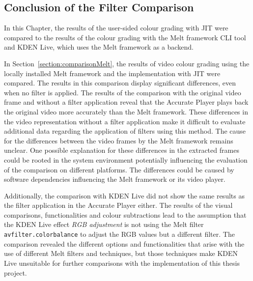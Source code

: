 \documentclass[../MasterThesis.tex]{subfiles}
\begin{document}

\newpage

\subsection{Conclusion of the Filter Comparison} \label{section:resultscomparisons}


In this Chapter, the results of the user-sided colour grading with JIT were compared to the results of the colour grading with the Melt framework CLI tool and KDEN Live, which uses the Melt framework as a backend.

In Section~\ref{section:comparisonMelt}, the results of video colour grading using the locally installed Melt framework and the implementation with JIT were compared. 
The results in this comparison display significant differences, even when no filter is applied. 
The results of the comparison with the original video frame and without a filter application reveal that the Accurate Player plays back the original video more accurately than the Melt framework.
These differences in the video representation without a filter application make it difficult to evaluate additional data regarding the application of filters using this method. The cause for the differences between the video frames by the Melt framework remains unclear.
One possible explanation for these differences in the extracted frames could be rooted in the system environment potentially influencing the evaluation of the comparison on different platforms. The differences could be caused by software dependencies influencing the Melt framework or its video player.



Additionally, the comparison with KDEN Live did not show the same results as the filter application in the Accurate Player either. The results of the visual comparisons, functionalities and colour subtractions lead to the assumption that the KDEN Live effect \textit{RGB adjustment} is not using the Melt filter \texttt{avfilter.colorbalance} to adjust the RGB values but a different filter.
The comparison revealed the different options and functionalities that arise with the use of different Melt filters and techniques, but those techniques make KDEN Live unsuitable for further comparisons with the implementation of this thesis project.
\end{document}
